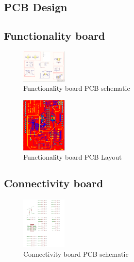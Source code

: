 \begin{appendices}

    \section{PCB Design}
        \subsection{Functionality board}
           \begin{figure}[H]
            \centering
            \includegraphics[width=0.2\textwidth]{funcSch.png}
            \caption{\label{fig:func_sch}Functionality board PCB schematic}
            \end{figure}

            \begin{figure}[H]
            \centering
            \includegraphics[width=0.2\textwidth]{funcBrd.png}
            \caption{\label{fig:func_brd}Functionality board PCB Layout}
            \end{figure}

        \subsection{Connectivity board}
            \begin{figure}[H]
            \centering
            \includegraphics[width=0.2\textwidth]{conSch.png}
            \caption{\label{fig:con_sch}Connectivity board PCB schematic}
            \end{figure}


\end{appendices}
